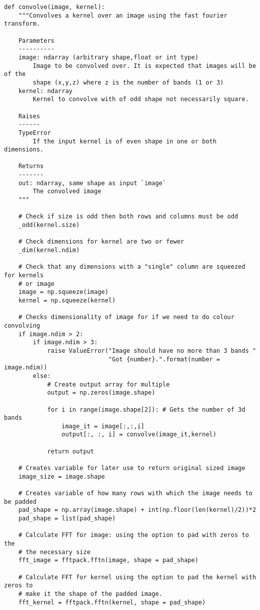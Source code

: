 \documentclass[a4paper,10pt]{article}
\begin{document}
\begin{lstlisting}
def convolve(image, kernel):
    """Convolves a kernel over an image using the fast fourier transform.

    Parameters
    ----------
    image: ndarray (arbitrary shape,float or int type)
        Image to be convolved over. It is expected that images will be of the
        shape (x,y,z) where z is the number of bands (1 or 3)
    kernel: ndarray
        Kernel to convolve with of odd shape not necessarily square.

    Raises
    ------
    TypeError
        If the input kernel is of even shape in one or both dimensions.

    Returns
    -------
    out: ndarray, same shape as input `image`
        The convolved image
    """

    # Check if size is odd then both rows and columns must be odd
    _odd(kernel.size)

    # Check dimensions for kernel are two or fewer
    _dim(kernel.ndim)

    # Check that any dimensions with a "single" column are squeezed for kernels
    # or image
    image = np.squeeze(image)
    kernel = np.squeeze(kernel)

    # Checks dimensionality of image for if we need to do colour convolving
    if image.ndim > 2:
        if image.ndim > 3:
            raise ValueError("Image should have no more than 3 bands "
                             "Got {number}.".format(number = image.ndim))
        else:
            # Create output array for multiple
            output = np.zeros(image.shape)

            for i in range(image.shape[2]): # Gets the number of 3d bands
                image_it = image[:,:,i]
                output[:, :, i] = convolve(image_it,kernel)

            return output

    # Creates variable for later use to return original sized image
    image_size = image.shape

    # Creates variable of how many rows with which the image needs to be padded
    pad_shape = np.array(image.shape) + int(np.floor(len(kernel)/2))*2
    pad_shape = list(pad_shape)

    # Calculate FFT for image: using the option to pad with zeros to the
    # the necessary size
    fft_image = fftpack.fftn(image, shape = pad_shape)

    # Calculate FFT for kernel using the option to pad the kernel with zeros to
    # make it the shape of the padded image.
    fft_kernel = fftpack.fftn(kernel, shape = pad_shape)


\end{lstlisting}
\end{document}
